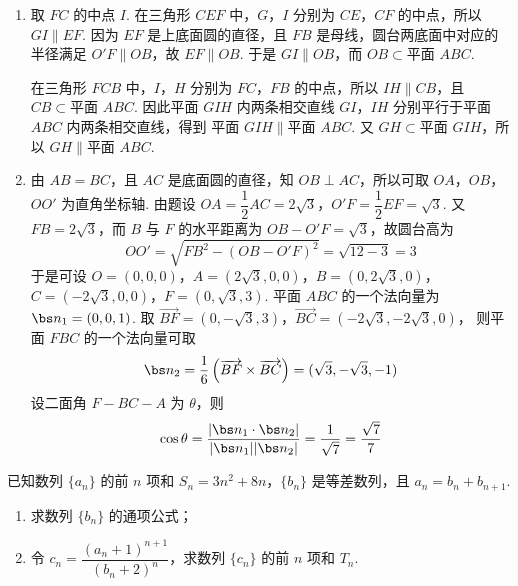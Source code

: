 \begin{solution}
\begin{enumerate}
\item 取 \(FC\) 的中点 \(I\). 在三角形 \(CEF\) 中，\(G\)，\(I\) 分别为 \(CE\)，\(CF\) 的中点，所以 \(GI\parallel EF\). 因为 \(EF\) 是上底面圆的直径，且 \(FB\) 是母线，圆台两底面中对应的半径满足 \(O'F\parallel OB\)，故 \(EF\parallel OB\). 于是 \(GI\parallel OB\)，而 \(OB\subset\text{平面 }ABC\).

在三角形 \(FCB\) 中，\(I\)，\(H\) 分别为 \(FC\)，\(FB\) 的中点，所以 \(IH\parallel CB\)，且 \(CB\subset\text{平面 }ABC\). 因此平面 \(GIH\) 内两条相交直线 \(GI\)，\(IH\) 分别平行于平面 \(ABC\) 内两条相交直线，得到 \(\text{平面 }GIH\parallel\text{平面 }ABC\). 又 \(GH\subset\text{平面 }GIH\)，所以 \(GH\parallel\text{平面 }ABC\).
\item 由 \(AB=BC\)，且 \(AC\) 是底面圆的直径，知 \(OB\perp AC\)，所以可取 \(OA\)，\(OB\)，\(OO'\) 为直角坐标轴.
由题设 \(OA=\dfrac12AC=2\sqrt3\)，\(O'F=\dfrac12EF=\sqrt3\).
又 \(FB=2\sqrt3\)，而 \(B\) 与 \(F\) 的水平距离为 \(OB-O'F=\sqrt3\)，故圆台高为
\[
OO'=\sqrt{FB^2-(OB-O'F)^2}=\sqrt{12-3}=3
\]
于是可设 \(O=(0,0,0)\)，\(A=(2\sqrt3,0,0)\)，\(B=(0,2\sqrt3,0)\)，\(C=(-2\sqrt3,0,0)\)，\(F=(0,\sqrt3,3)\).
平面 \(ABC\) 的一个法向量为 \(\bs n_1=(0,0,1)\).
取 \(\overrightarrow{BF}=(0,-\sqrt3,3)\)，\(\overrightarrow{BC}=(-2\sqrt3,-2\sqrt3,0)\)，
则平面 \(FBC\) 的一个法向量可取
\[
\bs n_2=\frac16\left(\overrightarrow{BF}\times\overrightarrow{BC}\right)=(\sqrt3,-\sqrt3,-1)
\]
设二面角 \(F-BC-A\) 为 \(\theta\)，则
\[
\cos\theta=\frac{|\bs n_1\cdot\bs n_2|}{|\bs n_1||\bs n_2|}=\frac1{\sqrt7}=\frac{\sqrt7}{7}
\]
\end{enumerate}
\end{solution}

\begin{problem}
已知数列 \(\{a_n\}\) 的前 \(n\) 项和 \(S_n=3n^2+8n\)，\(\{b_n\}\) 是等差数列，且 \(a_n=b_n+b_{n+1}\).
\begin{enumerate}
\item 求数列 \(\{b_n\}\) 的通项公式；
\item 令 \(c_n=\dfrac{\left(a_n+1\right)^{n+1}}{\left(b_n+2\right)^n}\)，求数列 \(\{c_n\}\) 的前 \(n\) 项和 \(T_n\).
\end{enumerate}
\end{problem}

